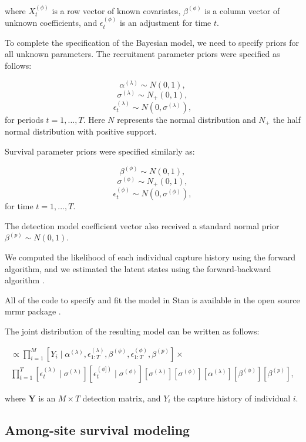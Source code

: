 \documentclass[9pt,twoside,lineno]{pnas-new}
\begin{document}
where \(X^{(\phi)}_t\) is a row vector of known covariates,
\(\beta^{(\phi)}\) is a column vector of unknown coefficients, and
\(\epsilon^{(\phi)}_t\) is an adjustment for time \(t\).

To complete the specification of the Bayesian model, we need to specify
priors for all unknown parameters. The recruitment parameter priors were
specified as follows:

\[\alpha^{(\lambda)} \sim N(0,1),\]
\[\sigma^{(\lambda)} \sim N_+(0,1),\]
\[\epsilon^{(\lambda)}_t \sim N(0, \sigma^{(\lambda)}),\] for periods
\(t=1, ..., T\). Here \(N\) represents the normal distribution and
\(N_+\) the half normal distribution with positive support.

Survival parameter priors were specified similarly as:

\[\beta^{(\phi)} \sim N(0, 1),\] \[\sigma^{(\phi)} \sim N_+(0, 1),\]
\[\epsilon^{(\phi)}_t \sim N(0, \sigma^{(\phi)}),\] for time
\(t=1, ..., T\).

The detection model coefficient vector also received a standard normal
prior \(\beta^{(p)} \sim N(0, 1)\).

We computed the likelihood of each individual capture history using the
forward algorithm, and we estimated the latent states using the
forward-backward algorithm \citep{zucchini2009, joseph2018}.

All of the code to specify and fit the model in Stan is available in the
open source mrmr package \citep{joseph2019}.

The joint distribution of the resulting model can be written as follows:

\begin{multline*}
[\alpha^{(\lambda)}, \sigma^{(\lambda)}, \epsilon^{(\lambda)}_{1:T}, \beta^{(\phi)}, \sigma^{(\phi)}, \epsilon^{(\phi)}_{1:T}, \beta^{(p)} \mid \pmb Y] \propto \prod_{i=1}^M [Y_i \mid \alpha^{(\lambda)}, \epsilon^{(\lambda)}_{1:T}, \beta^{(\phi)}, \epsilon^{(\phi)}_{1:T}, \beta^{(p)}] \times \\
\prod_{t=1}^T [\epsilon_t^{(\lambda)} \mid \sigma^{(\lambda)}] [\epsilon_t^{(\phi])} \mid \sigma^{(\phi)}] [\sigma^{(\lambda)}] [\sigma^{(\phi)}] [\alpha^{(\lambda)}] [\beta^{(\phi)}] [\beta^{(p)}],
\end{multline*}

where \(\pmb Y\) is an \(M \times T\) detection matrix, and \(Y_i\) the
capture history of individual \(i\).

\hypertarget{among-site-survival-modeling}{%
\subsection{Among-site survival
modeling}\label{among-site-survival-modeling}}
\end{document}
